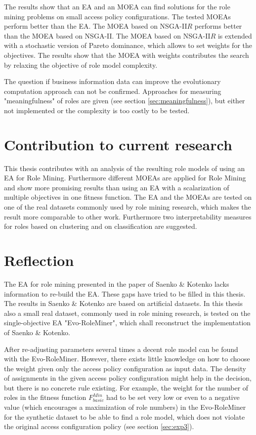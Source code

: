 The results show that an EA and an MOEA can find solutions for the role mining problems on small access policy configurations. The tested MOEAs perform better than the EA. The MOEA based on NSGA-II$R$\cite{Fortin:2013} performs better than the MOEA based on NSGA-II\cite{Deb:2002}. The MOEA based on NSGA-II$R$ is extended with a stochastic version of Pareto dominance, which allows to set weights for the objectives\cite{clune2013evolutionary}. The results show that the MOEA with weights contributes the search by relaxing the objective of role model complexity.

The question if business information data can improve the evolutionary computation approach can not be confirmed. Approaches for measuring "meaningfulness" of roles are given (see section \ref{sec:meaningfulness}), but either not implemented or the complexity is too costly to be tested.

\section{Contribution to current research}
This thesis contributes with an analysis of the resulting role models of using an EA for Role Mining. Furthermore different MOEAs are applied for Role Mining and show more promising results than using an EA with a scalarization of multiple objectives in one fitness function. The EA and the MOEAs are tested on one of the real datasets commonly used by role mining research, which makes the result more comparable to other work. Furthermore two interpretability measures for roles based on clustering and on classification are suggested.

\section{Reflection}
The EA for role mining presented in the paper of Saenko \& Kotenko lacks information to re-build the EA. These gaps have tried to be filled in this thesis. The results in Saenko \& Kotenko are based on artificial datasets. In this thesis also a small real dataset, commonly used in role mining research, is tested on the single-objective EA "Evo-RoleMiner", which shall reconstruct the implementation of Saenko \& Kotenko.

After re-adjusting parameters several times a decent role model can be found with the Evo-RoleMiner. However, there exists little knowledge on how to choose the weight given only the access policy configuration as input data. The density of assignments in the given access policy configuration might help in the decision, but there is no concrete rule existing. For example, the weight for the number of roles in the fitness function $F_{basic}^{Min}$ had to be set very low or even to a negative value (which encourages a maximization of role numbers) in the Evo-RoleMiner for the synthetic dataset to be able to find a role model, which does not violate the original access configuration policy (see section \ref{sec:exp3}).


